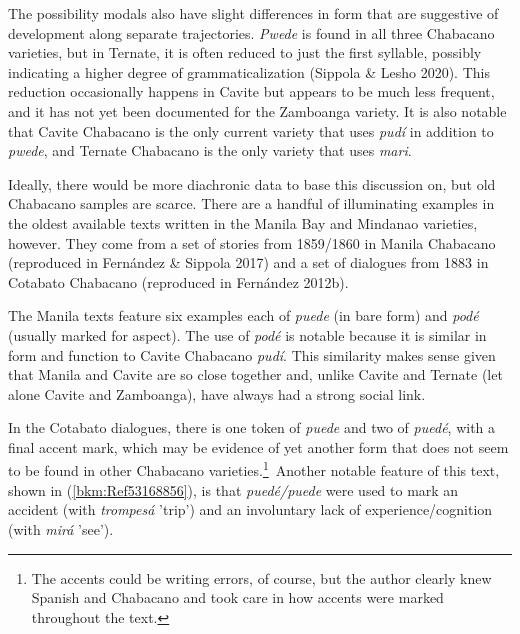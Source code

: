 \begin{styleStandard}
The possibility modals also have slight differences in form that are suggestive of development along separate trajectories. \textit{Pwede} is found in all three Chabacano varieties, but in Ternate, it is often reduced to just the first syllable, possibly indicating a higher degree of grammaticalization (Sippola \& Lesho 2020). This reduction occasionally happens in Cavite but appears to be much less frequent, and it has not yet been documented for the Zamboanga variety. It is also notable that Cavite Chabacano is the only current variety that uses \textit{pudí} in addition to \textit{pwede}, and Ternate Chabacano is the only variety that uses \textit{mari}.
\end{styleStandard}

\begin{styleStandard}
Ideally, there would be more diachronic data to base this discussion on, but old Chabacano samples are scarce. There are a handful of illuminating examples in the oldest available texts written in the Manila Bay and Mindanao varieties, however. They come from a set of stories from 1859/1860 in Manila Chabacano (reproduced in Fernández \& Sippola 2017) and a set of dialogues from 1883 in Cotabato Chabacano (reproduced in Fernández 2012b). 
\end{styleStandard}

\begin{styleStandard}
The Manila texts feature six examples each of \textit{puede} (in bare form) and \textit{podé} (usually marked for aspect). The use of \textit{podé} is notable because it is similar in form and function to Cavite Chabacano \textit{pudí}. This similarity makes sense given that Manila and Cavite are so close together and, unlike Cavite and Ternate (let alone Cavite and Zamboanga), have always had a strong social link. 
\end{styleStandard}

\begin{styleStandard}
In the Cotabato dialogues, there is one token of \textit{puede} and two of \textit{puedé}, with a final accent mark, which may be evidence of yet another form that does not seem to be found in other Chabacano varieties.\textstyleFootnoteSymbol{ }\footnote{ The accents could be writing errors, of course, but the author clearly knew Spanish and Chabacano and took care in how accents were marked throughout the text.}\ Another notable feature of this text, shown in (\ref{bkm:Ref53168856}), is that \textit{puedé/puede} were used to mark an accident (with \textit{trompesá} 'trip') and an involuntary lack of experience/cognition (with \textit{mirá} 'see'). 
\end{styleStandard}


